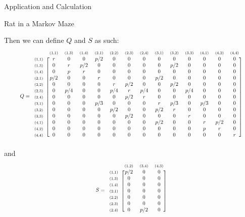 \documentclass[12pt]{article}
\newcommand{\matindex}[1]{\mbox{\scriptsize#1}}
\newcommand\scalemath[2]{\scalebox{#1}{\mbox{\ensuremath{\displaystyle #2}}}}
\numberwithin{equation}{section}
\begin{document}
\begin{section}{Application and Calculation}
\begin{subsection}{Rat in a Markov Maze}
\begin{enumerate}
        Then we can define $Q$ and $S$ as such:
        \[\scalemath{0.75}{Q=\begin{blockarray}{cccccccccccccc}&\matindex{(1,1)}&\matindex{(1,3)}&\matindex{(1,4)}&\matindex{(2,1)}&\matindex{(2,2)}&\matindex{(2,3)}&\matindex{(2,4)}&\matindex{(3,1)}&\matindex{(3,2)}&\matindex{(3,3)}&\matindex{(4,1)}&\matindex{(4,2)}&\matindex{(4,4)}\\
        \begin{block}{c[ccccccccccccc]}
        \matindex{(1,1)}&r&0&0&p/2&0&0&0&0&0&0&0&0&0\\
        \matindex{(1,3)}&0&r&p/2&0&0&0&0&0&p/2&0&0&0&0\\
        \matindex{(1,4)}&0&p&r&0&0&0&0&0&0&0&0&0&0\\
        \matindex{(2,1)}&p/2&0&0&r&0&0&0&p/2&0&0&0&0&0\\
        \matindex{(2,2)}&0&0&0&0&r&p/2&0&0&p/2&0&0&0&0\\
        \matindex{(2,3)}&0&p/4&0&0&p/4&r&p/4&0&0&p/4&0&0&0\\
        \matindex{(2,4)}&0&0&0&0&0&p/2&r&0&0&0&0&0&0\\
        \matindex{(3,1)}&0&0&0&p/3&0&0&0&r&p/3&0&p/3&0&0\\
        \matindex{(3,2)}&0&0&0&0&p/2&0&0&p/2&r&0&0&0&0\\
        \matindex{(3,3)}&0&0&0&0&0&p/2&0&0&0&r&0&0&0\\
        \matindex{(4,1)}&0&0&0&0&0&0&0&p/2&0&0&r&p/2&0\\
        \matindex{(4,2)}&0&0&0&0&0&0&0&0&0&0&p&r&0\\
        \matindex{(4,4)}&0&0&0&0&0&0&0&0&0&0&0&0&r\\
        \end{block}
        \end{blockarray}}\]
        and
        \[\scalemath{0.75}{S=\begin{blockarray}{cccc}
        &\matindex{(1,2)}&\matindex{(3,4)}&\matindex{(4,3)}\\
        \begin{block}{c[ccc]}
        \matindex{(1,1)}&p/2&0&0\\
        \matindex{(1,3)}&0&0&0\\
        \matindex{(1,4)}&0&0&0\\
        \matindex{(2,1)}&0&0&0\\
        \matindex{(2,2)}&0&0&0\\
        \matindex{(2,3)}&0&0&0\\
        \matindex{(2,4)}&0&p/2&0\\

\end{block}
\end{blockarray}}\]
\end{enumerate}
\end{subsection}
\end{section}
\end{document}
